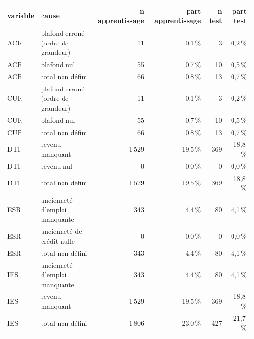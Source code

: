 \begin{tabular}{llrrrr}
\toprule
\textbf{variable} & \textbf{cause} & \textbf{n apprentissage} & \textbf{part apprentissage} & \textbf{n test} & \textbf{part test} \\
\midrule
ACR & plafond erroné (ordre de grandeur) & 11 & 0,1\,\% & 3 & 0,2\,\% \\
ACR & plafond nul & 55 & 0,7\,\% & 10 & 0,5\,\% \\
ACR & total non défini & 66 & 0,8\,\% & 13 & 0,7\,\% \\
CUR & plafond erroné (ordre de grandeur) & 11 & 0,1\,\% & 3 & 0,2\,\% \\
CUR & plafond nul & 55 & 0,7\,\% & 10 & 0,5\,\% \\
CUR & total non défini & 66 & 0,8\,\% & 13 & 0,7\,\% \\
DTI & revenu manquant & 1\,529 & 19,5\,\% & 369 & 18,8\,\% \\
DTI & revenu nul & 0 & 0,0\,\% & 0 & 0,0\,\% \\
DTI & total non défini & 1\,529 & 19,5\,\% & 369 & 18,8\,\% \\
ESR & ancienneté d'emploi manquante & 343 & 4,4\,\% & 80 & 4,1\,\% \\
ESR & ancienneté de crédit nulle & 0 & 0,0\,\% & 0 & 0,0\,\% \\
ESR & total non défini & 343 & 4,4\,\% & 80 & 4,1\,\% \\
IES & ancienneté d'emploi manquante & 343 & 4,4\,\% & 80 & 4,1\,\% \\
IES & revenu manquant & 1\,529 & 19,5\,\% & 369 & 18,8\,\% \\
IES & total non défini & 1\,806 & 23,0\,\% & 427 & 21,7\,\% \\
\bottomrule
\end{tabular}
